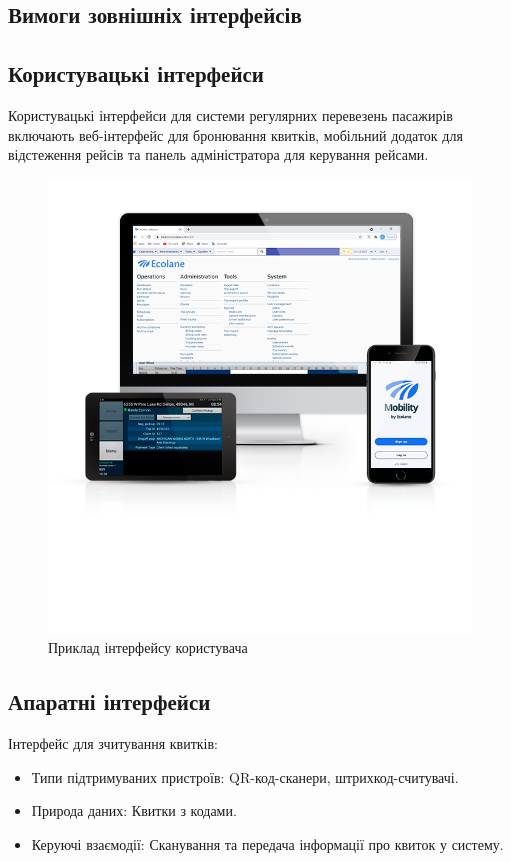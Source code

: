 \documentclass[14pt]{extreport}
\begin{document}
\begin{normalsize}
	\section*{Вимоги зовнішніх інтерфейсів}
	\subsection*{Користувацькі інтерфейси}
	Користувацькі інтерфейси для системи регулярних перевезень пасажирів включають веб-інтерфейс для бронювання квитків, мобільний додаток для відстеження рейсів та панель адміністратора для керування рейсами.
	
	\begin{figure}[H]
		\centering
		\includegraphics[trim={0 8cm 0 2cm},clip,scale=0.7]{1}
		\caption{Приклад інтерфейсу користувача}
	\end{figure}
	
	\subsection*{Апаратні інтерфейси}
	Інтерфейс для зчитування квитків:
	\begin{itemize}
		\item Типи підтримуваних пристроїв: QR-код-сканери, штрихкод-считувачі.
		\item Природа даних: Квитки з кодами.
		\item Керуючі взаємодії: Сканування та передача інформації про квиток у систему.
	\end{itemize}
	

\end{normalsize}
\end{document}
